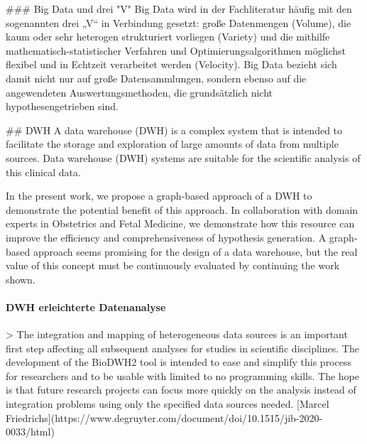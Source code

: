 ### Big Data und drei "V"
Big Data wird in der Fachliteratur häufig mit den sogenannten drei „V“ in Verbindung gesetzt: große Datenmengen (Volume), die kaum oder sehr heterogen strukturiert vorliegen (Variety) und die mithilfe mathematisch-statistischer Verfahren und Optimierungsalgorithmen möglichst flexibel und in Echtzeit verarbeitet werden (Velocity). Big Data bezieht sich damit nicht nur auf große Datensammlungen, sondern ebenso auf die angewendeten Auswertungsmethoden, die grundsätzlich nicht hypothesengetrieben sind. 



## DWH
A data warehouse (DWH) is a complex system that is intended to facilitate the storage and exploration of large amounts of data from multiple sources. Data warehouse (DWH) systems are suitable for the scientific analysis of this clinical data. 

In the present work, we propose a graph-based approach of a DWH to demonstrate the potential benefit of this approach. In collaboration with domain experts in Obstetrics and Fetal Medicine, we demonstrate how this resource can improve the efficiency and comprehensiveness of hypothesis generation. A graph-based approach seems promising for the design of a data warehouse, but the real value of this concept must be continuously evaluated by continuing the work shown. 

\paragraph{DWH erleichterte Datenanalyse}
> The integration and mapping of heterogeneous data sources is an important first step affecting all subsequent analyses for studies in scientific disciplines. The development of the BioDWH2 tool is intended to ease and simplify this process for researchers and to be usable with limited to no programming skills. The hope is that future research projects can focus more quickly on the analysis instead of integration problems using only the specified data sources needed. [Marcel Friedrichs](https://www.degruyter.com/document/doi/10.1515/jib-2020-0033/html)

